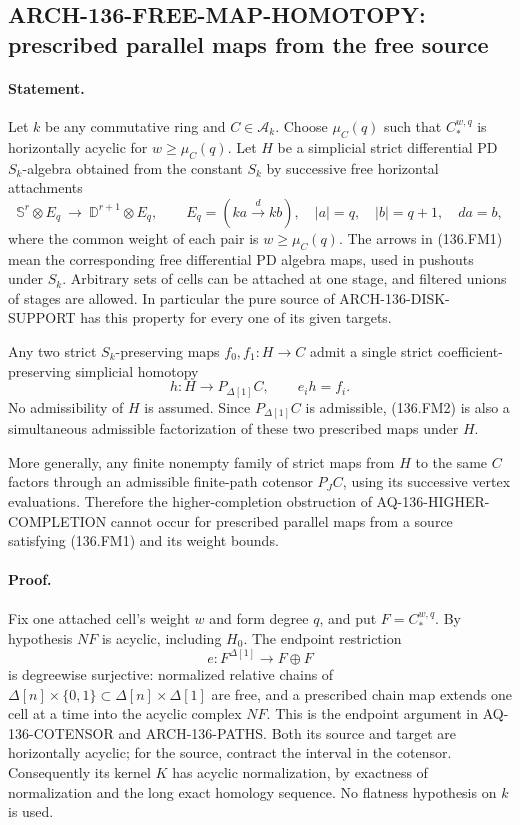 \subsection{ARCH-136-FREE-MAP-HOMOTOPY: prescribed parallel maps from the free source}
\label{sec:arch136freemaphomotopy}

\paragraph{Statement.}
Let $k$ be any commutative ring and $C\in\mathcal A_k$.  Choose
$\mu_C(q)$ such that $C_*^{w,q}$ is horizontally acyclic for
$w\geq\mu_C(q)$.  Let $H$ be a simplicial strict differential PD
$S_k$-algebra obtained from the constant $S_k$ by successive free
horizontal attachments
\[
 \mathbb S^r\otimes E_q\ \longrightarrow\
 \mathbb D^{r+1}\otimes E_q,
 \qquad E_q=(k a\xrightarrow{d}k b),\quad |a|=q,
 \quad |b|=q+1,\quad da=b,                                \tag{136.FM1}
\]
where the common weight of each pair is $w\geq\mu_C(q)$.
The arrows in (136.FM1) mean the corresponding free differential
PD algebra maps, used in pushouts under $S_k$.  Arbitrary sets of
cells can be attached at one stage, and filtered unions of stages
are allowed.  In particular the pure source of
ARCH-136-DISK-SUPPORT has this property for every one of its given
targets.

Any two strict $S_k$-preserving maps $f_0,f_1:H\to C$ admit a single
strict coefficient-preserving simplicial homotopy
\[
                  h:H\longrightarrow P_{\Delta[1]}C,
                  \qquad e_i h=f_i.                       \tag{136.FM2}
\]
No admissibility of $H$ is assumed.  Since $P_{\Delta[1]}C$ is
admissible, (136.FM2) is also a simultaneous admissible factorization
of these two prescribed maps under $H$.

More generally, any finite nonempty family of strict maps from $H$
to the same $C$ factors through an admissible finite-path cotensor
$P_JC$, using its successive vertex evaluations.  Therefore the
higher-completion obstruction of AQ-136-HIGHER-COMPLETION cannot
occur for prescribed parallel maps from a source satisfying
(136.FM1) and its weight bounds.

\paragraph{Proof.}
Fix one attached cell's weight $w$ and form degree $q$, and put
$F=C_*^{w,q}$.  By hypothesis $NF$ is acyclic, including $H_0$.
The endpoint restriction
\[
        e:F^{\Delta[1]}\longrightarrow F\oplus F
\]
is degreewise surjective: normalized relative chains of
$\Delta[n]\times\{0,1\}\subset\Delta[n]\times\Delta[1]$
are free, and a prescribed chain map extends one cell at a time
into the acyclic complex $NF$.  This is the endpoint argument
in AQ-136-COTENSOR and ARCH-136-PATHS.  Both its source and target
are horizontally acyclic; for the source, contract the interval
in the cotensor.  Consequently its kernel $K$ has acyclic
normalization, by exactness of normalization and the long exact
homology sequence.  No flatness hypothesis on $k$ is used.

